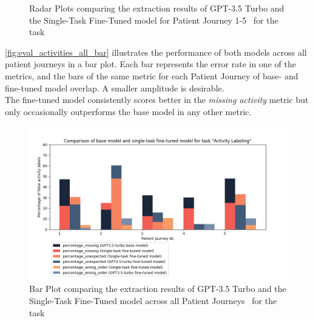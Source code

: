 \begin{figure}[h]
  \caption{Radar Plots comparing the extraction results of GPT-3.5 Turbo and the Single-Task Fine-Tuned model for Patient Journey 1-5~ for the task }
  \label{fig:eval_activities_single_rad}
\end{figure}
\autoref{fig:eval_activities_all_bar} illustrates the performance of both models across all patient journeys in a bar plot. Each bar represents the error rate in one of the metrics, and the bars of the same metric for each Patient Journey of base- and fine-tuned model overlap. A smaller amplitude is desirable. \\
The fine-tuned model consistently scores better in the \emph{missing activity} metric but only occasionally outperforms the base model in any other metric. 
\begin{figure}[h]
    \centering
    \captionsetup{belowskip=0pt,aboveskip=0pt}
    \includegraphics[width=\textwidth]{bachelor_thesis/images/activites_all-single.png}
    \caption{Bar Plot comparing the extraction results of GPT-3.5 Turbo and the Single-Task Fine-Tuned model across all Patient Journeys~ for the task } 
    \label{fig:eval_activities_all_bar}
\end{figure}

